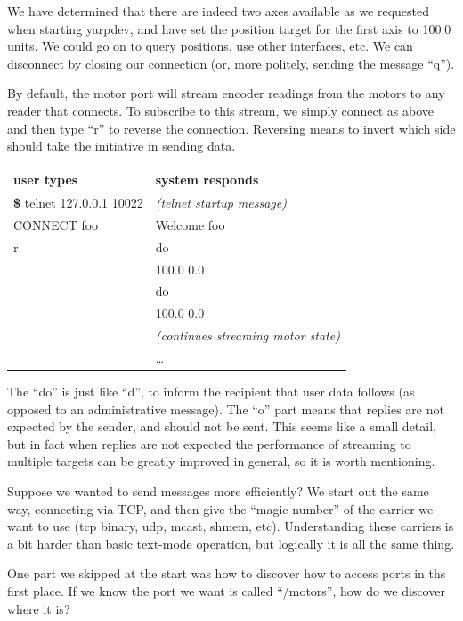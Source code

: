 We have determined that there are indeed two axes available as we requested
when starting yarpdev, and have set the position target for the
first axis to 100.0 units.  We could go on to query positions, use
other interfaces, etc.  We can disconnect by closing our connection
(or, more politely, sending the message ``q'').

By default, the motor port will stream encoder readings from the motors
to any reader that connects.  To subscribe to this stream, we simply
connect as above and then type ``r'' to reverse the connection.
Reversing means to invert which side should take the initiative
in sending data.


\begin{center}
\begin{tabular}{ll}
\hline\hline
{\bf user types} & {\bf system responds} \\
\hline
{\bf \$} telnet 127.0.0.1 10022 & {\it (telnet startup message)} \\
CONNECT foo & Welcome foo \\
r & do \\
& 100.0 0.0 \\
 & do \\
 & 100.0 0.0 \\
 & {\it (continues streaming motor state)} \\
 & \ldots \\
\hline\hline
\end{tabular}
\end{center}


The ``do'' is just like ``d'', to inform the recipient that user data
follows (as opposed to an administrative message).  
The ``o'' part means that replies are not expected by the
sender, and should not be sent.  This seems like a small detail,
but in fact when replies are not expected the performance of 
streaming to multiple targets can be greatly improved in general,
so it is worth mentioning.

Suppose we wanted to send messages more efficiently?  We start out the
same way, connecting via TCP, and then give the ``magic number'' of
the carrier we want to use (tcp binary, udp, mcast, shmem, etc).
Understanding these carriers is a bit harder than basic text-mode operation,
but logically it is all the same thing.

One part we skipped at the start was how to discover how to 
access ports in ths first place.  If we know the port we want
is called ``/motors'', how do we discover where it is?

